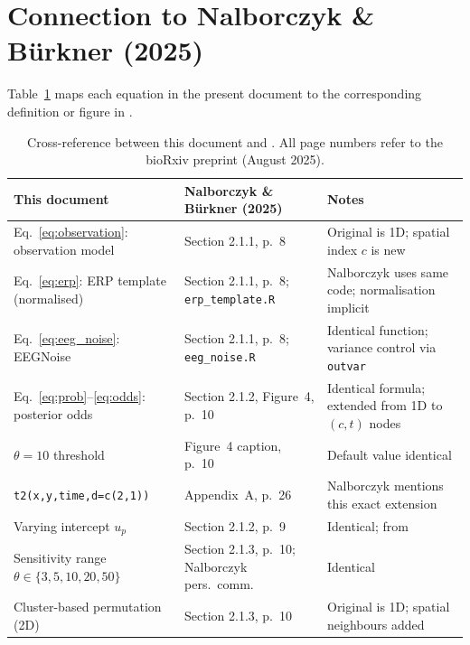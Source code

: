 \documentclass[12pt, a4paper]{article}
\begin{document}
\section{Connection to Nalborczyk \& Bürkner (2025)}\label{sec:connection}

Table~\ref{tab:mapping} maps each equation in the present document to the
corresponding definition or figure in \citet{Nalborczyk2025}.

\begin{table}[ht]
\centering
\caption{Cross-reference between this document and \citet{Nalborczyk2025}.
All page numbers refer to the bioRxiv preprint (August 2025).}
\label{tab:mapping}
\small
\begin{tabular}{p{5cm} p{4.5cm} p{4.5cm}}
\toprule
\textbf{This document} & \textbf{Nalborczyk \& Bürkner (2025)} & \textbf{Notes} \\
\midrule
Eq.~\ref{eq:observation}: observation model
  & Section 2.1.1, p.~8
  & Original is 1D; spatial index $c$ is new \\
Eq.~\ref{eq:erp}: ERP template (normalised)
  & Section 2.1.1, p.~8; \texttt{erp\_template.R}
  & Nalborczyk uses same code; normalisation implicit \\
Eq.~\ref{eq:eeg_noise}: EEGNoise
  & Section 2.1.1, p.~8; \texttt{eeg\_noise.R}
  & Identical function; variance control via \texttt{outvar} \\
Eq.~\ref{eq:prob}--\ref{eq:odds}: posterior odds
  & Section 2.1.2, Figure~4, p.~10
  & Identical formula; extended from 1D to $(c,t)$ nodes \\
$\theta = 10$ threshold
  & Figure~4 caption, p.~10
  & Default value identical \\
\texttt{t2(x,y,time,d=c(2,1))}
  & Appendix~A, p.~26
  & Nalborczyk mentions this exact extension \\
Varying intercept $u_p$
  & Section 2.1.2, p.~9
  & Identical; from \citet{Nalborczyk2019} \\
Sensitivity range $\theta \in \{3,5,10,20,50\}$
  & Section 2.1.3, p.~10; Nalborczyk pers.\ comm.
  & Identical \\
Cluster-based permutation (2D)
  & Section 2.1.3, p.~10
  & Original is 1D; spatial neighbours added \\
\bottomrule
\end{tabular}
\end{table}

\end{document}
